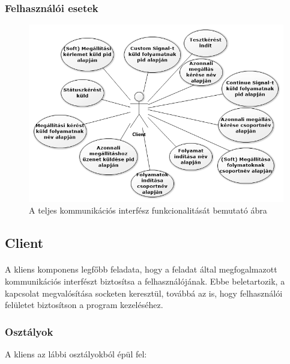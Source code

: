 \documentclass[12pt]{report}
\begin{document}
\pagebreak

 \subsubsection{Felhasználói esetek}
        \begin{figure}[ht]
       \centering
       \includegraphics[width=15cm]{pics/func_uc.png}
	  \caption{A teljes kommunikációs interfész funkcionalitását bemutató ábra \newline}
  \end{figure}
  
\subsection{Client}
\paragraph{}
A kliens komponens legfőbb feladata, hogy a feladat által megfogalmazott kommunikációs interfészt biztosítsa a felhasználójának. Ebbe beletartozik, a kapcsolat megvalósítása socketen keresztül, továbbá az is, hogy felhasználói felületet biztosítson a program kezeléséhez.
    
\subsubsection{Osztályok}
A kliens az lábbi osztályokból épül fel:
\end{document}
